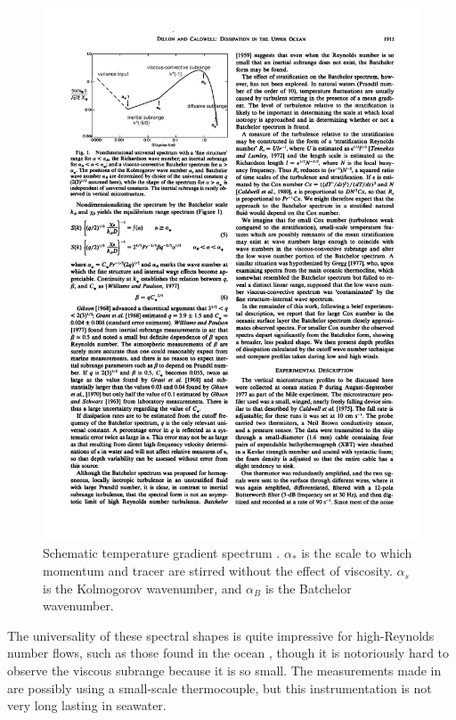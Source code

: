 \documentclass[11pt]{article}
\begin{document}
\begin{figure}[hbtp]
  \begin{center}
    \includegraphics[width=5in]{images/DillonCaldwell80aFig1}
    \caption{Schematic temperature gradient spectrum \citep{dilloncaldwell80}. 
$\alpha_*$ is the scale to which momentum and tracer are stirred without the
effect of viscosity.  $\alpha_s$ is the Kolmogorov wavenumber, and $\alpha_B$
is the Batchelor wavenumber.}   
    \label{fig:DillonCaldwell80aFig1}
  \end{center}
\end{figure}

The universality of these spectral shapes is quite impressive for high-Reynolds
number flows, such as those found in the ocean ,
though it is notoriously hard to observe the viscous subrange because it is so
small.  The measurements made in  are possibly using a
small-scale thermocouple, but this instrumentation is not very long lasting in
seawater.  
\end{document}
